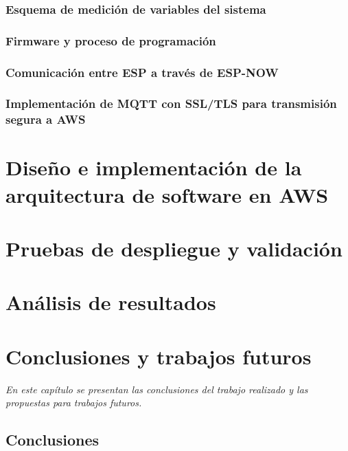 \documentclass[letterpaper,12pt, oneside]{book}
\begin{document}
\subsection{Esquema de medición de variables del sistema}

\subsection{Firmware y proceso de programación}

\subsection{Comunicación entre ESP a través de ESP-NOW}

\subsection{Implementación de MQTT con SSL/TLS para transmisión segura a AWS}


\chapter{Diseño e implementación de la arquitectura de software en AWS} \label{Cap3}

\chapter{Pruebas de despliegue y validación} \label{Cap4}



\chapter{Análisis de resultados} \label{Cap5}

\chapter{Conclusiones y trabajos futuros}

\textit{En este capítulo se presentan las conclusiones del trabajo realizado y las propuestas para trabajos futuros.}

\section{Conclusiones}
\end{document}
